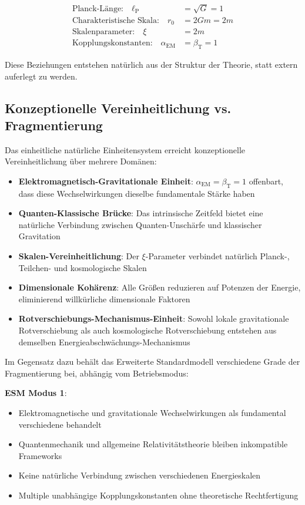 \documentclass[12pt,a4paper]{article}
\newcommand{\alphaEM}{\alpha_{\text{EM}}}
\newcommand{\betaT}{\beta_{\text{T}}}
\newcommand{\lP}{\ell_{\text{P}}}
\newcommand{\xipar}{\xi}
\begin{document}
	\begin{align}
		\text{Planck-Länge:} \quad \lP &= \sqrt{G} = 1 \nonumber\\
		\text{Charakteristische Skala:} \quad r_0 &= 2Gm = 2m \nonumber\\
		\text{Skalenparameter:} \quad \xipar &= 2m \nonumber\\
		\text{Kopplungskonstanten:} \quad \alphaEM &= \betaT = 1 \nonumber
	\end{align}
	
	Diese Beziehungen entstehen natürlich aus der Struktur der Theorie, statt extern auferlegt zu werden.
	
	\subsection{Konzeptionelle Vereinheitlichung vs. Fragmentierung}
	\label{subsec:unification_fragmentation}
	
	Das einheitliche natürliche Einheitensystem erreicht konzeptionelle Vereinheitlichung über mehrere Domänen:
	
	\begin{itemize}
		\item \textbf{Elektromagnetisch-Gravitationale Einheit}: $\alphaEM = \betaT = 1$ offenbart, dass diese Wechselwirkungen dieselbe fundamentale Stärke haben
		\item \textbf{Quanten-Klassische Brücke}: Das intrinsische Zeitfeld bietet eine natürliche Verbindung zwischen Quanten-Unschärfe und klassischer Gravitation
		\item \textbf{Skalen-Vereinheitlichung}: Der $\xipar$-Parameter verbindet natürlich Planck-, Teilchen- und kosmologische Skalen
		\item \textbf{Dimensionale Kohärenz}: Alle Größen reduzieren auf Potenzen der Energie, eliminierend willkürliche dimensionale Faktoren
		\item \textbf{Rotverschiebungs-Mechanismus-Einheit}: Sowohl lokale gravitationale Rotverschiebung als auch kosmologische Rotverschiebung entstehen aus demselben Energieabschwächungs-Mechanismus
	\end{itemize}
	
	Im Gegensatz dazu behält das Erweiterte Standardmodell verschiedene Grade der Fragmentierung bei, abhängig vom Betriebsmodus:
	
	\textbf{ESM Modus 1}:
	\begin{itemize}
		\item Elektromagnetische und gravitationale Wechselwirkungen als fundamental verschiedene behandelt
		\item Quantenmechanik und allgemeine Relativitätstheorie bleiben inkompatible Frameworks
		\item Keine natürliche Verbindung zwischen verschiedenen Energieskalen
		\item Multiple unabhängige Kopplungskonstanten ohne theoretische Rechtfertigung
	\end{itemize}
	
\end{document}
